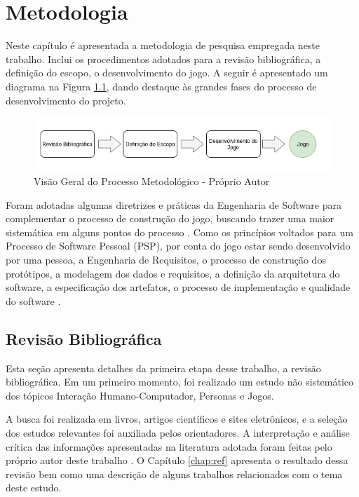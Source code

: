 \chapter{Metodologia}
\label{chap:Metodo}

Neste capítulo é apresentada a metodologia de pesquisa empregada neste trabalho. Inclui os procedimentos adotados para a revisão bibliográfica, a definição do escopo, o desenvolvimento do jogo. A seguir é apresentado um diagrama na Figura \ref{Fig:all_process.png}, dando destaque às grandes fases do processo de desenvolvimento do projeto.

\begin{figure}[htbp]
	\centering
		\includegraphics[keepaspectratio=true,scale=0.7]{figuras/all_process.png}
	\caption{Visão Geral do Processo Metodológico - Próprio Autor}
	\label{Fig:all_process.png}
\end{figure}

Foram adotadas algumas diretrizes e práticas da Engenharia de Software para complementar o processo de construção do jogo, buscando trazer uma maior sistemática em alguns pontos do processo \cite[p. 39]{Pressman_2000} \cite[p. 31]{Bourque_2014}. Como os princípios voltados para um Processo de Software Pessoal (PSP), por conta do jogo estar sendo desenvolvido por uma pessoa, a Engenharia de Requisitos, o processo de construção dos protótipos, a modelagem dos dados e requisitos, a definição da arquitetura do software, a especificação dos artefatos, o processo de implementação e qualidade do software \cite[p. 74]{Pressman_2000}.  %


\section{Revisão Bibliográfica} 

Esta seção apresenta detalhes da primeira etapa desse trabalho, a revisão bibliográfica. Em um primeiro momento, foi realizado um estudo não sistemático dos tópicos Interação Humano-Computador, Personas e Jogos.

A busca foi realizada em livros, artigos científicos e sites eletrônicos, e a seleção dos estudos relevantes foi auxiliada pelos orientadores. A interpretação e análise crítica das informações apresentadas na literatura adotada foram feitas pelo próprio autor deste trabalho \cite{ROTHER2007}. O Capítulo \ref{chap:ref} apresenta o resultado dessa revisão bem como uma descrição de alguns trabalhos relacionados com o tema deste estudo. 

